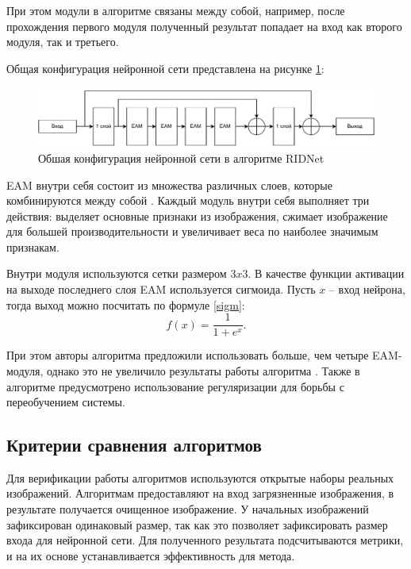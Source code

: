 При этом модули в алгоритме связаны между собой, например, после прохождения первого модуля полученный результат попадает на вход как второго модуля, так и третьего.

Общая конфигурация нейронной сети представлена на рисунке \ref{fig::ridnetall}:
\FloatBarrier
\begin{figure}[h]	
	\begin{center}
		\includegraphics[width=\linewidth]{inc/pdf/ridnet.pdf}
	\end{center}
	\captionsetup{justification=centering}
	\caption{Обшая конфигурация нейронной сети в алгоритме RIDNet}
	\label{fig::ridnetall}
\end{figure}
\FloatBarrier

EAM внутри себя состоит из множества различных слоев, которые комбинируются между собой \cite{ridnet}.
Каждый модуль внутри себя выполняет три действия: выделяет основные признаки из изображения, сжимает изображение для большей производительности и увеличивает веса по наиболее значимым признакам.

Внутри модуля используются сетки размером $3x3$. 
В качестве функции активации на выходе последнего слоя EAM используется сигмоида. 
Пусть $x$ -- вход нейрона, тогда выход можно посчитать по формуле \eqref{sigm}:
\begin{equation}
	\label{sigm}
	f(x) = \frac{1}{1+e^x}.
\end{equation}

При этом авторы алгоритма предложили использовать больше, чем четыре EAM-модуля, однако это не увеличило результаты работы алгоритма \cite{ridnet2}.
Также в алгоритме предусмотрено использование регуляризации для борьбы с переобучением системы.

\subsection{Критерии сравнения алгоритмов}
Для верификации работы алгоритмов используются открытые наборы реальных изображений. 
Алгоритмам предоставляют на вход загрязненные изображения, в результате получается очищенное изображение.
У начальных изображений зафиксирован одинаковый размер, так как это позволяет зафиксировать размер входа для нейронной сети.
Для полученного результата подсчитываются метрики, и на их основе устанавливается эффективность для метода.

